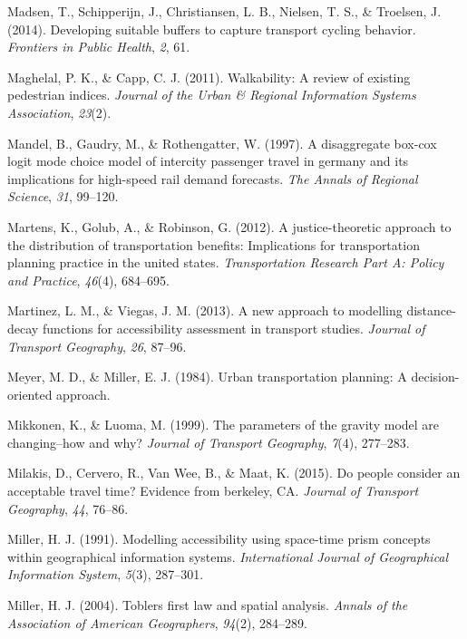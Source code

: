 \documentclass[
11pt, %
oneside, %
english, %
singlespacing, %
]{macthesis} %
\newlength{\cslhangindent}
\newenvironment{CSLReferences}[2] %
 {%
  \setlength{\parindent}{0pt}
  \ifodd #1 \everypar{\setlength{\hangindent}{\cslhangindent}}\ignorespaces\fi
  \ifnum #2 > 0
  \setlength{\parskip}{#2\baselineskip}
  \fi
 }%
 {}
\begin{document}
\begin{CSLReferences}{1}{0}
Madsen, T., Schipperijn, J., Christiansen, L. B., Nielsen, T. S., \& Troelsen, J. (2014). Developing suitable buffers to capture transport cycling behavior. \emph{Frontiers in Public Health}, \emph{2}, 61.

Maghelal, P. K., \& Capp, C. J. (2011). Walkability: A review of existing pedestrian indices. \emph{Journal of the Urban \& Regional Information Systems Association}, \emph{23}(2).

Mandel, B., Gaudry, M., \& Rothengatter, W. (1997). A disaggregate box-cox logit mode choice model of intercity passenger travel in germany and its implications for high-speed rail demand forecasts. \emph{The Annals of Regional Science}, \emph{31}, 99--120.

Martens, K., Golub, A., \& Robinson, G. (2012). A justice-theoretic approach to the distribution of transportation benefits: Implications for transportation planning practice in the united states. \emph{Transportation Research Part A: Policy and Practice}, \emph{46}(4), 684--695.

Martinez, L. M., \& Viegas, J. M. (2013). A new approach to modelling distance-decay functions for accessibility assessment in transport studies. \emph{Journal of Transport Geography}, \emph{26}, 87--96.

Meyer, M. D., \& Miller, E. J. (1984). Urban transportation planning: A decision-oriented approach.

Mikkonen, K., \& Luoma, M. (1999). The parameters of the gravity model are changing--how and why? \emph{Journal of Transport Geography}, \emph{7}(4), 277--283.

Milakis, D., Cervero, R., Van Wee, B., \& Maat, K. (2015). Do people consider an acceptable travel time? Evidence from berkeley, CA. \emph{Journal of Transport Geography}, \emph{44}, 76--86.

Miller, H. J. (1991). Modelling accessibility using space-time prism concepts within geographical information systems. \emph{International Journal of Geographical Information System}, \emph{5}(3), 287--301.

Miller, H. J. (2004). Toblers first law and spatial analysis. \emph{Annals of the Association of American Geographers}, \emph{94}(2), 284--289.


\end{CSLReferences}
\end{document}
